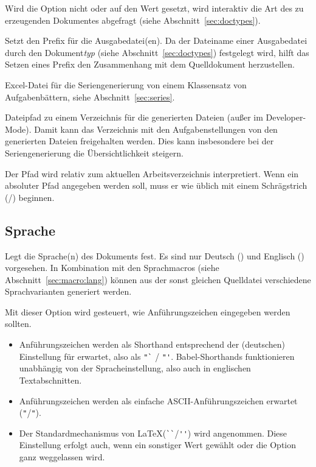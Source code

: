 \documentclass[
load=osgexam,
babel=ngerman
]{skdoc}
\begin{document}
Wird die Option nicht oder auf den Wert  gesetzt, wird interaktiv die Art des zu erzeugenden Dokumentes
abgefragt (siehe Abschnitt~\ref{sec:doctypes}).
\medskip

Setzt den Prefix für die Ausgabedatei(en). Da der Dateiname einer Ausgabedatei durch den Dokument\emph{typ} (siehe Abschnitt~\ref{sec:doctypes}) festgelegt
wird, hilft das Setzen eines Prefix den Zusammenhang mit dem Quelldokument herzustellen.
\medskip

 Excel-Datei für die Seriengenerierung von einem Klassensatz von
Aufgabenbättern, siehe Abschnitt~\ref{sec:series}.
\medskip

Dateipfad zu einem Verzeichnis für die generierten Dateien (außer im Developer-Mode). Damit kann das Verzeichnis mit den
Aufgabenstellungen von den generierten Dateien freigehalten werden. Dies kann insbesondere bei der Seriengenerierung die
Übersichtlichkeit steigern.

Der Pfad wird relativ zum aktuellen Arbeitsverzeichnis interpretiert. Wenn ein absoluter Pfad angegeben werden soll,
muss er wie üblich mit einem Schrägstrich (/) beginnen.
\medskip

\subsection*{Sprache}
Legt die Sprache(n) des Dokuments fest. Es sind nur Deutsch () und Englisch () vorgesehen. In
Kombination mit den Sprachmacros (siehe Abschnitt~\ref{sec:macro:lang}) können aus der sonst gleichen Quelldatei verschiedene
Sprachvarianten generiert werden.\medskip

Mit dieser Option wird gesteuert, wie Anführungszeichen eingegeben werden sollten.
\begin{itemize}[nosep]
  \item [\opt{babelshorthands}] Anführungszeichen werden als Shorthand entsprechend der (deutschen) Einstellung für
     erwartet, also als \verb!"`! / \verb!"'!. Babel-Shorthands funktionieren unabhängig von der
    Spracheinstellung, also auch in englischen Textabschnitten.
  \item [\opt{ascii}] Anführungszeichen werden als einfache ASCII-Anführungszeichen erwartet (\verb!"!/\verb!"!). 
  \item [\opt{latex}]  Der Standardmechanismus von \LaTeX (\verb!``!/\verb!''!) wird angenommen. Diese Einstellung
    erfolgt auch, wenn ein sonstiger Wert gewählt oder die Option ganz weggelassen wird.
\end{itemize}
\medskip
\end{document}
